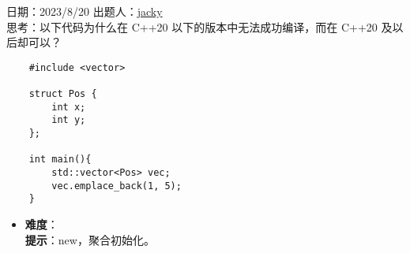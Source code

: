日期：2023/8/20 出题人：\href{https://github.com/rsp4jack}{jacky}\\

思考：以下代码为什么在 C++20 以下的版本中无法成功编译，而在 C++20 及以后却可以？

\begin{verbatim}
    #include <vector>

    struct Pos {
        int x;
        int y;
    };
    
    int main(){
        std::vector<Pos> vec;
        vec.emplace_back(1, 5);
    }
\end{verbatim}

\begin{itemize}
\item \textbf{难度}：  \\
      \textbf{提示}：new，聚合初始化。
\end{itemize}